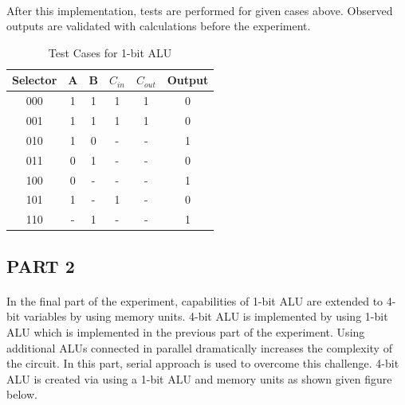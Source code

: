 \documentclass[pdftex,12pt,a4paper]{article}
\begin{document}
\begin{flushleft}
\paragraph{}
After this implementation, tests are performed for given cases above. Observed outputs are validated with calculations before the experiment. 


\begin{table}[]
    \centering
    \begin{tabular}{c|c|c|c|c|c}
         Selector & A & B & $C_{in}$ & $C_{out}$ & Output  \\ \hline
         000 & 1 & 1 & 1 & 1 & 0 \\   
         001 & 1 & 1 & 1 & 1 & 0 \\   
         010 & 1 & 0 & - & - & 1 \\  
         011 & 0 & 1 & - & - & 0 \\
         
         100 & 0 & - & - & - & 1 \\   
         101 & 1 & - & 1 & - & 0 \\ 
         110 & - & 1 & - & - & 1 \\
    \end{tabular}
    \caption{Test Cases for 1-bit ALU}
    \label{tab:my_label}
\end{table}

\subsection{PART 2}
\paragraph{}
In the final part of the experiment, capabilities of 1-bit ALU are extended to 4-bit variables by using memory units. 4-bit ALU is implemented by using 1-bit ALU which is implemented in the previous part of the experiment. Using additional ALUs connected in parallel dramatically increases the complexity of the circuit. In this part, serial approach is used to overcome this challenge. 4-bit ALU is created via using a 1-bit ALU and memory units as shown given figure below.


\end{flushleft}
\end{document}
